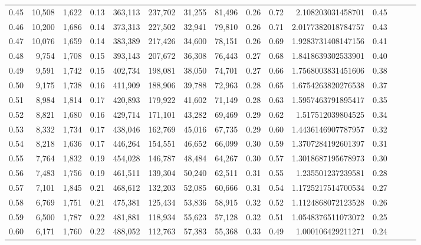 \begin{tabular}{rrrrrrrrrrrrrrr}
0.45 &  10,508 &  1,622 &  0.13 &  363,113 &  237,702 &   31,255 &   81,496 &  0.26 &  0.72 &      2.108203031458701 &      0.45 \\
0.46 &  10,200 &  1,686 &  0.14 &  373,313 &  227,502 &   32,941 &   79,810 &  0.26 &  0.71 &     2.0177382018784757 &      0.43 \\
0.47 &  10,076 &  1,659 &  0.14 &  383,389 &  217,426 &   34,600 &   78,151 &  0.26 &  0.69 &     1.9283731408147156 &      0.41 \\
0.48 &   9,754 &  1,708 &  0.15 &  393,143 &  207,672 &   36,308 &   76,443 &  0.27 &  0.68 &     1.8418639302533901 &      0.40 \\
0.49 &   9,591 &  1,742 &  0.15 &  402,734 &  198,081 &   38,050 &   74,701 &  0.27 &  0.66 &     1.7568003831451606 &      0.38 \\
0.50 &   9,175 &  1,738 &  0.16 &  411,909 &  188,906 &   39,788 &   72,963 &  0.28 &  0.65 &     1.6754263820276538 &      0.37 \\
0.51 &   8,984 &  1,814 &  0.17 &  420,893 &  179,922 &   41,602 &   71,149 &  0.28 &  0.63 &     1.5957463791895417 &      0.35 \\
0.52 &   8,821 &  1,680 &  0.16 &  429,714 &  171,101 &   43,282 &   69,469 &  0.29 &  0.62 &      1.517512039804525 &      0.34 \\
0.53 &   8,332 &  1,734 &  0.17 &  438,046 &  162,769 &   45,016 &   67,735 &  0.29 &  0.60 &     1.4436146907787957 &      0.32 \\
0.54 &   8,218 &  1,636 &  0.17 &  446,264 &  154,551 &   46,652 &   66,099 &  0.30 &  0.59 &     1.3707284192601397 &      0.31 \\
0.55 &   7,764 &  1,832 &  0.19 &  454,028 &  146,787 &   48,484 &   64,267 &  0.30 &  0.57 &     1.3018687195678973 &      0.30 \\
0.56 &   7,483 &  1,756 &  0.19 &  461,511 &  139,304 &   50,240 &   62,511 &  0.31 &  0.55 &      1.235501237239581 &      0.28 \\
0.57 &   7,101 &  1,845 &  0.21 &  468,612 &  132,203 &   52,085 &   60,666 &  0.31 &  0.54 &     1.1725217514700534 &      0.27 \\
0.58 &   6,769 &  1,751 &  0.21 &  475,381 &  125,434 &   53,836 &   58,915 &  0.32 &  0.52 &     1.1124868072123528 &      0.26 \\
0.59 &   6,500 &  1,787 &  0.22 &  481,881 &  118,934 &   55,623 &   57,128 &  0.32 &  0.51 &     1.0548376511073072 &      0.25 \\
0.60 &   6,171 &  1,760 &  0.22 &  488,052 &  112,763 &   57,383 &   55,368 &  0.33 &  0.49 &      1.000106429211271 &      0.24 \\

\end{tabular}
